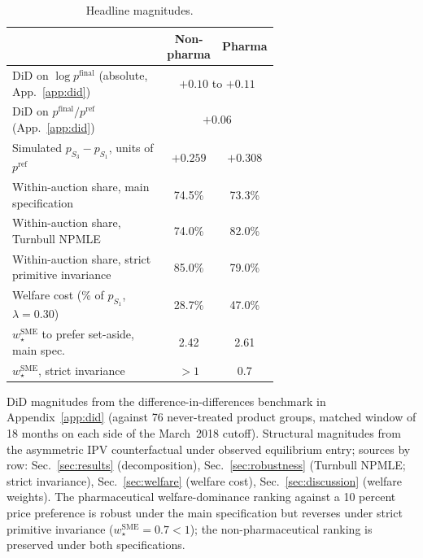 \begin{table}[!htbp]
\centering
\footnotesize
\setlength{\tabcolsep}{4pt}
\begin{threeparttable}
\caption{Headline magnitudes.}
\label{tab:preview}
\begin{tabular}{@{}p{0.65\linewidth} c c@{}}
\toprule
 & \textbf{Non-pharma} & \textbf{Pharma} \\
\midrule
DiD on $\log p^{\mathrm{final}}$ (absolute, App.~\ref{app:did}) & \multicolumn{2}{c}{$+0.10$ to $+0.11$} \\
DiD on $p^{\mathrm{final}}/p^{\mathrm{ref}}$ (App.~\ref{app:did}) & \multicolumn{2}{c}{$+0.06$} \\
Simulated $p_{S_3} - p_{S_1}$, units of $p^{\mathrm{ref}}$ & $+0.259$ & $+0.308$ \\
\addlinespace
Within-auction share, main specification & 74.5\% & 73.3\% \\
Within-auction share, Turnbull NPMLE & 74.0\% & 82.0\% \\
Within-auction share, strict primitive invariance & 85.0\% & 79.0\% \\
\addlinespace
Welfare cost (\% of $p_{S_1}$, $\lambda = 0.30$) & 28.7\% & 47.0\% \\
$w^{\text{SME}}_\star$ to prefer set-aside, main spec. & 2.42 & 2.61 \\
$w^{\text{SME}}_\star$, strict invariance & $> 1$ & 0.7 \\
\bottomrule
\end{tabular}
\begin{tablenotes}[flushleft]\footnotesize
\item DiD magnitudes from the difference-in-differences benchmark in Appendix~\ref{app:did} (against 76 never-treated product groups, matched window of 18 months on each side of the March~2018 cutoff). Structural magnitudes from the asymmetric IPV counterfactual under observed equilibrium entry; sources by row: Sec.~\ref{sec:results} (decomposition), Sec.~\ref{sec:robustness} (Turnbull NPMLE; strict invariance), Sec.~\ref{sec:welfare} (welfare cost), Sec.~\ref{sec:discussion} (welfare weights). The pharmaceutical welfare-dominance ranking against a 10 percent price preference is robust under the main specification but reverses under strict primitive invariance ($w^{\text{SME}}_\star = 0.7 < 1$); the non-pharmaceutical ranking is preserved under both specifications.
\end{tablenotes}
\end{threeparttable}
\end{table}
